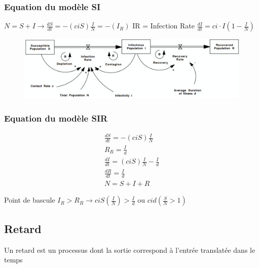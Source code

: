 \documentclass[resume]{subfiles}
\begin{document}
\subsubsection{Equation du modèle SI}

$N=S+I \rightarrow \frac{dS}{dt}=-(ciS)\frac{I}{N}= -(I_R)$ IR = Infection Rate $\frac{dI}{dt}=ci\cdot I(1-\frac{I}{N})$ 

\begin{figure}[H]
    \centering
    \includegraphics[width=1\columnwidth]{Figures/SIR_1.png}
\end{figure}

\subsubsection{Equation du modèle SIR}

\begin{multline*}
\frac{dS}{dt}=-(ciS)\frac{I}{N}\\
R_R=\frac{I}{d}\\
\frac{dI}{dt} = (ciS)\frac{I}{N}-\frac{I}{d}\\
\frac{dR}{dt} = \frac{I}{d}\\
N=S+I+R
\end{multline*}

Point de bascule $I_R > R_R \rightarrow ciS(\frac{I}{N}) > \frac{I}{d}$ ou $cid(\frac{S}{N} > 1)$ 

\subsection{Retard}

Un retard est un processus dont la sortie correspond à l’entrée translatée dans le temps
\end{document}
